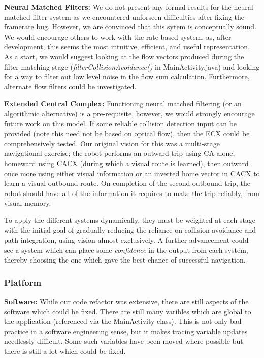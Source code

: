 \documentclass[a4paper,11pt,twoside,openright]{article}
\begin{document}
\textbf{Neural Matched Filters:} We do not present any formal results
for the neural matched filter system as we encountered unforseen
difficulties after fixing the framerate bug. However, we are convinced
that this sytem is conceptually sound. We would encourage others to
work with the rate-based system, as, after development, this seems the
most intuitive, efficient, and useful representation. As a start, we
would suggest looking at the flow vectors produced during the filter
matching stage (\textit{filterCollisionAvoidance()} in
MainActivity.java) and looking for a way to filter out low level
noise in the flow sum calculation. Furthermore, alternate flow filters
could be investigated.
\newline\par

\textbf{Extended Central Complex:} Functioning neural matched
filtering (or an algorithmic alternative) is a pre-requisite, however,
we would strongly encourage future work on this model. If some
reliable collision detection input can be provided (note this need not
be based on optical flow), then the ECX could be comprehensively
tested. Our original vision for this was a multi-stage navigational
exercise; the robot performs an outward trip using CA alone, homeward
using CACX (during which a visual route is learned), then outward once
more using either visual information or an inverted home vector in
CACX to learn a visual outbound route. On completion of the second
outbound trip, the robot should have all of the information it
requires to make the trip reliably, from visual memory. \newline\par

To apply the different systems dynamically, they must be weighted at
each stage with the initial goal of gradually reducing the reliance on
collision avoidance and path integration, using vision almost
exclusively. A further advancement could see a system which can place
some \textit{confidence} in the output from each system, thereby
choosing the one which gave the best chance of successful navigation.
\newline\par

\subsubsection{Platform}\label{sec:disc:platform}
\textbf{Software:} While our code refactor was extensive, there are
still aspects of the software which could be fixed. There are still
many varibles which are global to the application (referenced via the
MainActivity class). This is not only bad practice in a software
engineering sense, but it makes tracing variable updates needlessly
difficult. Some such variables have been moved where possible but
there is still a lot which could be fixed.\newline\par
\end{document}
